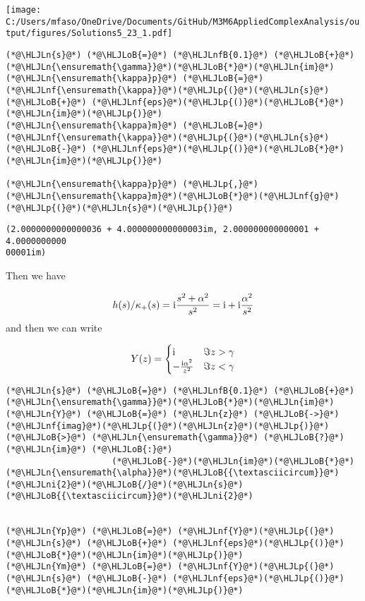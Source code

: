 \documentclass[12pt,landscape]{article}
\newcommand{\HLJLn}[1]{#1}
\newcommand{\HLJLnf}[1]{\textcolor[RGB]{66,102,213}{#1}}
\newcommand{\HLJLnfB}[1]{\textcolor[RGB]{59,151,46}{#1}}
\newcommand{\HLJLni}[1]{\textcolor[RGB]{59,151,46}{#1}}
\newcommand{\HLJLoB}[1]{\textcolor[RGB]{102,102,102}{\textbf{#1}}}
\newcommand{\HLJLp}[1]{#1}
\def\I{ {\rm i} }
\begin{document}
{\texttt{[image: C:/Users/mfaso/OneDrive/Documents/GitHub/M3M6AppliedComplexAnalysis/output/figures/Solutions5\_23\_1.pdf]}

\begin{lstlisting}
(*@\HLJLn{s}@*) (*@\HLJLoB{=}@*) (*@\HLJLnfB{0.1}@*) (*@\HLJLoB{+}@*) (*@\HLJLn{\ensuremath{\gamma}}@*)(*@\HLJLoB{*}@*)(*@\HLJLn{im}@*)
(*@\HLJLn{\ensuremath{\kappa}p}@*) (*@\HLJLoB{=}@*) (*@\HLJLnf{\ensuremath{\kappa}}@*)(*@\HLJLp{(}@*)(*@\HLJLn{s}@*) (*@\HLJLoB{+}@*) (*@\HLJLnf{eps}@*)(*@\HLJLp{()}@*)(*@\HLJLoB{*}@*)(*@\HLJLn{im}@*)(*@\HLJLp{)}@*)
(*@\HLJLn{\ensuremath{\kappa}m}@*) (*@\HLJLoB{=}@*) (*@\HLJLnf{\ensuremath{\kappa}}@*)(*@\HLJLp{(}@*)(*@\HLJLn{s}@*) (*@\HLJLoB{-}@*) (*@\HLJLnf{eps}@*)(*@\HLJLp{()}@*)(*@\HLJLoB{*}@*)(*@\HLJLn{im}@*)(*@\HLJLp{)}@*)

(*@\HLJLn{\ensuremath{\kappa}p}@*) (*@\HLJLp{,}@*) (*@\HLJLn{\ensuremath{\kappa}m}@*)(*@\HLJLoB{*}@*)(*@\HLJLnf{g}@*)(*@\HLJLp{(}@*)(*@\HLJLn{s}@*)(*@\HLJLp{)}@*)
\end{lstlisting}

\begin{lstlisting}
(2.0000000000000036 + 4.000000000000003im, 2.000000000000001 + 4.0000000000
00001im)
\end{lstlisting}


Then we have

\[
h(s)/\kappa_+(s) =  \I {s^2 + \alpha^2 \over s^2} = \I + \I {\alpha^2 \over s^2}
\]
and then we can write

\[
Y(z) = \begin{cases}
\I & \Im z > \gamma \\
-{\I \alpha^2 \over z^2} & \Im z < \gamma
\end{cases}
\]

\begin{lstlisting}
(*@\HLJLn{s}@*) (*@\HLJLoB{=}@*) (*@\HLJLnfB{0.1}@*) (*@\HLJLoB{+}@*) (*@\HLJLn{\ensuremath{\gamma}}@*)(*@\HLJLoB{*}@*)(*@\HLJLn{im}@*)
(*@\HLJLn{Y}@*) (*@\HLJLoB{=}@*) (*@\HLJLn{z}@*) (*@\HLJLoB{->}@*) (*@\HLJLnf{imag}@*)(*@\HLJLp{(}@*)(*@\HLJLn{z}@*)(*@\HLJLp{)}@*) (*@\HLJLoB{>}@*) (*@\HLJLn{\ensuremath{\gamma}}@*) (*@\HLJLoB{?}@*) (*@\HLJLn{im}@*) (*@\HLJLoB{:}@*)
                     (*@\HLJLoB{-}@*)(*@\HLJLn{im}@*)(*@\HLJLoB{*}@*)(*@\HLJLn{\ensuremath{\alpha}}@*)(*@\HLJLoB{{\textasciicircum}}@*)(*@\HLJLni{2}@*)(*@\HLJLoB{/}@*)(*@\HLJLn{s}@*)(*@\HLJLoB{{\textasciicircum}}@*)(*@\HLJLni{2}@*)


(*@\HLJLn{Yp}@*) (*@\HLJLoB{=}@*) (*@\HLJLnf{Y}@*)(*@\HLJLp{(}@*)(*@\HLJLn{s}@*) (*@\HLJLoB{+}@*) (*@\HLJLnf{eps}@*)(*@\HLJLp{()}@*)(*@\HLJLoB{*}@*)(*@\HLJLn{im}@*)(*@\HLJLp{)}@*)
(*@\HLJLn{Ym}@*) (*@\HLJLoB{=}@*) (*@\HLJLnf{Y}@*)(*@\HLJLp{(}@*)(*@\HLJLn{s}@*) (*@\HLJLoB{-}@*) (*@\HLJLnf{eps}@*)(*@\HLJLp{()}@*)(*@\HLJLoB{*}@*)(*@\HLJLn{im}@*)(*@\HLJLp{)}@*)


\end{lstlisting}}
\end{document}
